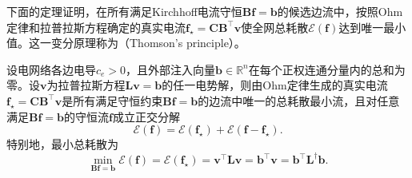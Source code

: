 下面的定理证明，在所有满足Kirchhoff电流守恒$\bm B\bm f=\bm b$的候选边流中，按照Ohm定律和拉普拉斯方程确定的真实电流$\bm f_\star=\bm C\bm B^\top\bm v$使全网总耗散$\mathcal E(\bm f)$达到唯一最小值。这一变分原理称为（Thomson's principle）。

\begin{theorem}[Thomson原理]
\label{thm:electrical-thomson}
设电网络各边电导$c_e>0$，且外部注入向量$\bm b\in\mathbb R^n$在每个正权连通分量内的总和为零。设$\bm v$为拉普拉斯方程$\bm L\bm v=\bm b$的任一电势解，则由Ohm定律生成的真实电流$\bm f_\star = \bm C\bm B^\top \bm v$是所有满足守恒约束$\bm B\bm f = \bm b$的边流中唯一的总耗散最小流，且对任意满足$\bm B\bm f=\bm b$的守恒流$\bm f$成立正交分解
\begin{equation}
  \mathcal E(\bm f) = \mathcal E(\bm f_\star) + \mathcal E(\bm f - \bm f_\star).
  \label{eq:electrical-dissipation-decomposition}
\end{equation}
特别地，最小总耗散为
\begin{equation}
  \min_{\bm B\bm f = \bm b}\mathcal E(\bm f)
  = \mathcal E(\bm f_\star)
  = \bm v^\top\bm L\bm v
  = \bm b^\top \bm v
  = \bm b^\top \bm L^\dagger \bm b.
  \label{eq:electrical-minimum-dissipation}
\end{equation}
\end{theorem}

